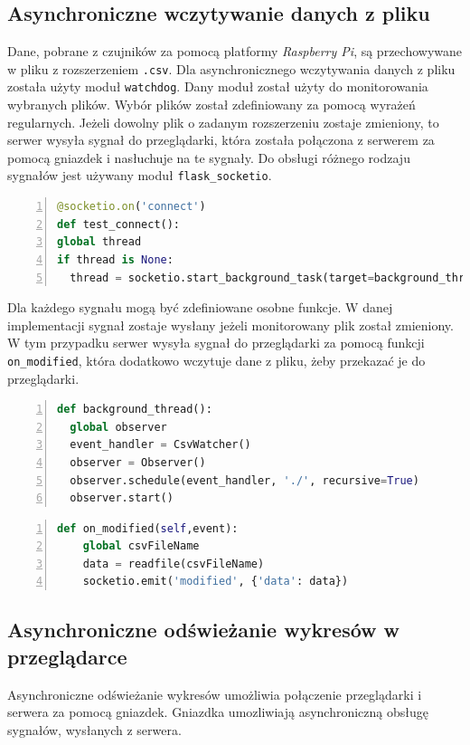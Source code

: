 \documentclass[a4paper]{article}
\begin{document}
\subsection{Asynchroniczne wczytywanie danych z pliku}
    Dane, pobrane z czujników za pomocą platformy \textit{Raspberry Pi}, są przechowywane w pliku z rozszerzeniem \texttt{.csv}.
    Dla asynchronicznego wczytywania danych z pliku została użyty moduł \texttt{watchdog}.
    Dany moduł został użyty do monitorowania wybranych plików. 
    Wybór plików został zdefiniowany za pomocą wyrażeń regularnych. 
    Jeżeli dowolny plik o zadanym rozszerzeniu zostaje zmieniony, to serwer wysyła sygnał do przeglądarki,
    która została połączona z serwerem za pomocą gniazdek i nasłuchuje na te sygnały.
    Do obsługi różnego rodzaju sygnałów jest używany moduł \texttt{flask\_socketio}.
    \begin{lstlisting}[frame=single, numbers=left, basicstyle=\ttfamily\small, language=python,
    caption={Połączenie gniazdka na serwerze z gniazdkiem w przeglądrce}]
@socketio.on('connect')
def test_connect():
global thread
if thread is None:
  thread = socketio.start_background_task(target=background_thread)
    \end{lstlisting}

    Dla każdego sygnału mogą być zdefiniowane osobne funkcje. 
    W danej implementacji sygnał zostaje wysłany 
    jeżeli monitorowany plik został zmieniony. W tym przypadku serwer wysyła sygnał
    do przeglądarki za pomocą funkcji \texttt{on\_modified}, która dodatkowo
    wczytuje dane z pliku, żeby przekazać je do przeglądarki.
   \begin{lstlisting}[frame=single, numbers=left, basicstyle=\ttfamily\small, language=python,
    caption={Definicja wątku, monitorującego zmiany w plikach o zadanym rozszerzeniu}]
def background_thread():
  global observer
  event_handler = CsvWatcher()
  observer = Observer()
  observer.schedule(event_handler, './', recursive=True)
  observer.start()
   \end{lstlisting}

\begin{lstlisting}[frame=single, numbers=left, basicstyle=\ttfamily\small, language=python,
    caption={Definicja funkcji wysyłającej sygnał i dane}]
def on_modified(self,event):
    global csvFileName
    data = readfile(csvFileName)
    socketio.emit('modified', {'data': data})
   \end{lstlisting}

    \subsection{Asynchroniczne odświeżanie wykresów w przeglądarce}
    Asynchroniczne odświeżanie wykresów umożliwia połączenie przeglądarki i serwera za pomocą gniazdek.
    Gniazdka umozliwiają asynchroniczną obsługę sygnałów, wysłanych z serwera.
    
\end{document}
